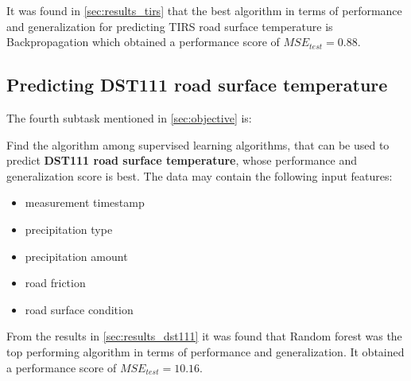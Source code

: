 	It was found in \ref{sec:results_tirs} that the best algorithm in terms of performance and generalization for predicting TIRS road surface temperature is Backpropagation which obtained a performance score of $MSE_{test} = 0.88$.

	\subsection{Predicting DST111 road surface temperature}
		The fourth subtask mentioned in \ref{sec:objective} is:
	
	Find the algorithm among supervised learning algorithms, that can be used to predict \textbf{DST111 road surface temperature}, whose performance and generalization score is best. The data may contain the following input features: 
			\begin{itemize}
				\item measurement timestamp
				\item precipitation type
				\item precipitation amount
				\item road friction
				\item road surface condition
			\end{itemize}

	From the results in \ref{sec:results_dst111} it was found that Random forest was the top performing algorithm in terms of performance and generalization. It obtained a performance score of $MSE_{test} = 10.16$.
	
